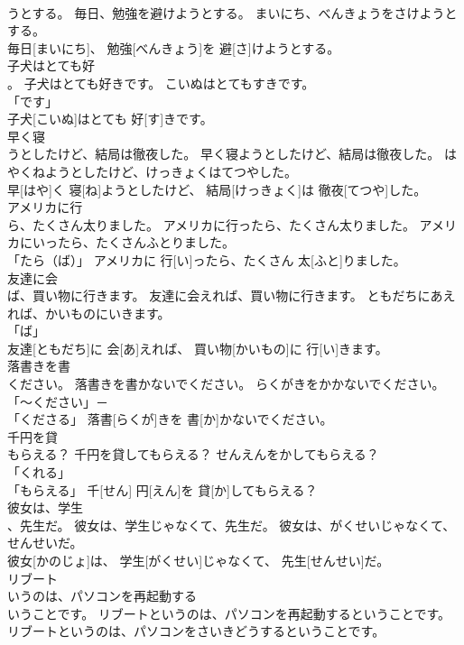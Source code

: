 \documentclass[8pt]{extreport}
\begin{document}
\begin{CJK}{UTF8}{min}
\\	うとする。	毎日、勉強を避けようとする。	まいにち、べんきょうをさけようとする。	
\\	毎日[まいにち]、 勉強[べんきょう]を 避[さ]けようとする。		
\\	子犬はとても好
\\	。	子犬はとても好きです。	こいぬはとてもすきです。	
\\	「です」 
\\	子犬[こいぬ]はとても 好[す]きです。		
\\	早く寝
\\	うとしたけど、結局は徹夜した。	早く寝ようとしたけど、結局は徹夜した。	はやくねようとしたけど、けっきょくはてつやした。	
\\	早[はや]く 寝[ね]ようとしたけど、 結局[けっきょく]は 徹夜[てつや]した。		
\\	アメリカに行
\\	ら、たくさん太りました。	アメリカに行ったら、たくさん太りました。	アメリカにいったら、たくさんふとりました。	
\\	「たら（ば）」	アメリカに 行[い]ったら、たくさん 太[ふと]りました。		
\\	友達に会
\\	ば、買い物に行きます。	友達に会えれば、買い物に行きます。	ともだちにあえれば、かいものにいきます。	
\\	「ば」 
\\	友達[ともだち]に 会[あ]えれば、 買い物[かいもの]に 行[い]きます。		
\\	落書きを書
\\	ください。	落書きを書かないでください。	らくがきをかかないでください。	
\\	「～ください」－ 
\\	「くださる」	落書[らくが]きを 書[か]かないでください。		
\\	千円を貸
\\	もらえる？	千円を貸してもらえる？	せんえんをかしてもらえる？	
\\	「くれる」 
\\	「もらえる」	千[せん] 円[えん]を 貸[か]してもらえる？		
\\	彼女は、学生
\\	、先生だ。	彼女は、学生じゃなくて、先生だ。	彼女は、がくせいじゃなくて、せんせいだ。	
\\	彼女[かのじょ]は、 学生[がくせい]じゃなくて、 先生[せんせい]だ。		
\\	リブート
\\	いうのは、パソコンを再起動する
\\	いうことです。	リブートというのは、パソコンを再起動するということです。	リブートというのは、パソコンをさいきどうするということです。	

\end{CJK}
\end{document}
